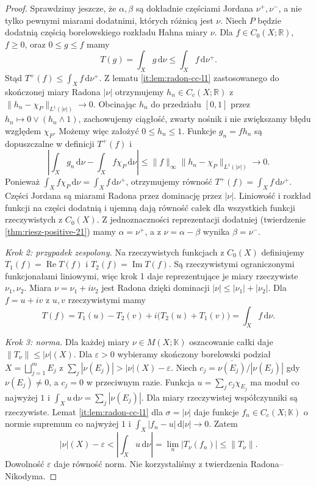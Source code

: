\begin{proof}
Sprawdzimy jeszcze, że $\alpha,\beta$ są dokładnie
częściami Jordana $\nu^+,\nu^-$, a nie tylko pewnymi
miarami dodatnimi, których różnicą jest $\nu$.
Niech $P$ będzie dodatnią częścią borelowskiego
rozkładu Hahna miary $\nu$.
Dla $f\in C_0(X;\mathbb R)$, $f\ge0$, oraz
$0\le g\le f$ mamy
\[
 T(g)=\int_X g\,\mathrm d\nu
 \le\int_X f\,\mathrm d\nu^+.
\]
Stąd $T^+(f)\le\int_X f\,\mathrm d\nu^+$.
Z lematu \ref{it:lem:radon-cc-l1} zastosowanego
do skończonej miary Radona $|\nu|$ otrzymujemy
$h_n\in C_c(X;\mathbb R)$ z
$\|h_n-\chi_P\|_{L^1(|\nu|)}\to0$.
Obcinając $h_n$ do przedziału $[0,1]$ przez
$h_n\mapsto0\vee(h_n\wedge1)$, zachowujemy
ciągłość, zwarty nośnik i nie zwiększamy błędu
względem $\chi_P$. Możemy więc założyć
$0\le h_n\le1$. Funkcje $g_n=fh_n$ są
dopuszczalne w definicji $T^+(f)$ i
\[
 \left|\int_X g_n\,\mathrm d\nu
             -\int_X f\chi_P\,\mathrm d\nu\right|
 \le\|f\|_\infty\|h_n-\chi_P\|_{L^1(|\nu|)}
 \longrightarrow0.
\]
Ponieważ $\int_X f\chi_P\,\mathrm d\nu
=\int_X f\,\mathrm d\nu^+$, otrzymujemy równość
$T^+(f)=\int_X f\,\mathrm d\nu^+$.
Części Jordana są miarami Radona przez dominację
przez $|\nu|$. Liniowość i rozkład funkcji na części
dodatnią i ujemną dają równość całek dla wszystkich
funkcji rzeczywistych z $C_0(X)$. Z jednoznaczności
reprezentacji dodatniej
(twierdzenie \ref{thm:riesz-positive-21}) mamy
$\alpha=\nu^+$, a z $\nu=\alpha-\beta$ wynika
$\beta=\nu^-$.

\emph{Krok 2: przypadek zespolony.}
Na rzeczywistych funkcjach z $C_0(X)$ definiujemy
$T_1(f)=\operatorname{Re}T(f)$ i
$T_2(f)=\operatorname{Im}T(f)$. Są rzeczywistymi
ograniczonymi funkcjonałami liniowymi, więc krok 1
daje reprezentujące je miary rzeczywiste $\nu_1,\nu_2$.
Miara $\nu=\nu_1+i\nu_2$ jest Radona dzięki dominacji
$|\nu|\le|\nu_1|+|\nu_2|$. Dla $f=u+iv$ z $u,v$
rzeczywistymi mamy
\[
 T(f)=T_1(u)-T_2(v)+i\bigl(T_2(u)+T_1(v)\bigr)
 =\int_X f\,\mathrm d\nu.
\]

\emph{Krok 3: norma.}
Dla każdej miary $\nu\in M(X;\mathbb K)$ oszacowanie
całki daje $\|T_\nu\|\le|\nu|(X)$.
Dla $\varepsilon>0$ wybieramy skończony borelowski
podział $X=\bigsqcup_{j=1}^m E_j$ z
$\sum_j|\nu(E_j)|>|\nu|(X)-\varepsilon$.
Niech $c_j=\overline{\nu(E_j)}/|\nu(E_j)|$ gdy
$\nu(E_j)\ne0$, a $c_j=0$ w przeciwnym razie.
Funkcja $u=\sum_jc_j\chi_{E_j}$ ma moduł co najwyżej
$1$ i $\int_Xu\,\mathrm d\nu=\sum_j|\nu(E_j)|$.
Dla miary rzeczywistej współczynniki są rzeczywiste.
Lemat \ref{it:lem:radon-cc-l1} dla $\sigma=|\nu|$
daje funkcje $f_n\in C_c(X;\mathbb K)$ o normie
supremum co najwyżej $1$ i
$\int_X|f_n-u|\,\mathrm d|\nu|\to0$. Zatem
\[
 |\nu|(X)-\varepsilon
 <\left|\int_Xu\,\mathrm d\nu\right|
 =\lim_n|T_\nu(f_n)|\le\|T_\nu\|.
\]
Dowolność $\varepsilon$ daje równość norm.
Nie korzystaliśmy z twierdzenia Radona--Nikodyma.


\end{proof}

